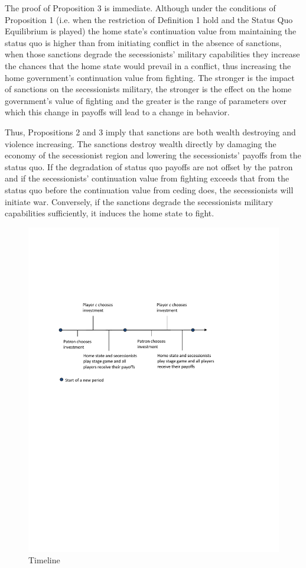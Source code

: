 The proof of Proposition 3 is immediate. Although under the conditions of Proposition 1 (i.e. when the restriction of Definition 1 hold and the Status Quo Equilibrium is played) the home state's continuation value from maintaining the status quo is higher than from initiating conflict in the absence of sanctions, when those sanctions degrade the secessionists' military capabilities they increase the chances that the home state would prevail in a conflict, thus increasing the home government's continuation value from fighting. The stronger is the impact of sanctions on the secessionists military, the stronger is the effect on the home government's value of fighting and the greater is the range of parameters over which this change in payoffs will lead to a change in behavior.

Thus, Propositions 2 and 3 imply that sanctions are both wealth destroying and violence increasing. The sanctions destroy wealth directly by damaging the economy of the secessionist region and lowering the secessionists' payoffs from the status quo. If the degradation of status quo payoffs are not offset by the patron and if the secessionists' continuation value from fighting exceeds that from the status quo before the continuation value from ceding does, the secessionists will initiate war. Conversely, if the sanctions degrade the secessionists military capabilities sufficiently, it induces the home state to fight.


\newpage

\begin{figure}
\includegraphics{Timeline2.pdf}
\caption{Timeline}
\end{figure}

